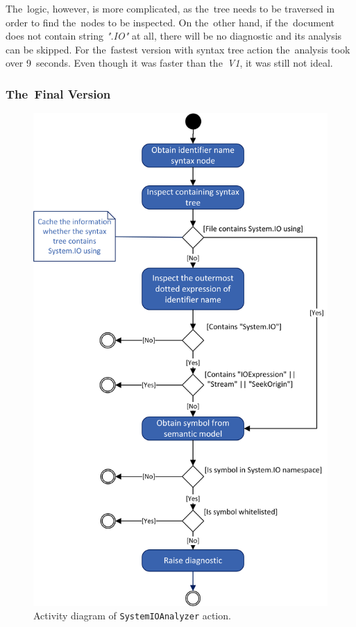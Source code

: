 \documentclass[
  digital, %
  table,   %
  lof,     %
  lot,     %
  oneside,
]{fithesis3}
\begin{document}
The~logic, however, is more complicated, as the~tree needs to be traversed in order to find the~nodes to be inspected. On the~other hand, if the~document does not contain string \textit{".IO"} at all, there will be no diagnostic and its analysis can be skipped. For the~fastest version with syntax tree action the~analysis took over 9~seconds. Even though it was faster than the~\textit{V1}, it was still not ideal.

\subsubsection{\textbf{The~Final Version}}
\begin{figure}
		\centering
			\includegraphics[scale=0.98]{img/uml/system-io-activity-diagram}
		\caption{Activity diagram of \texttt{SystemIOAnalyzer} action.}
		\label{fig:uml-system-io-activity-diagram}
\end{figure}
\end{document}
